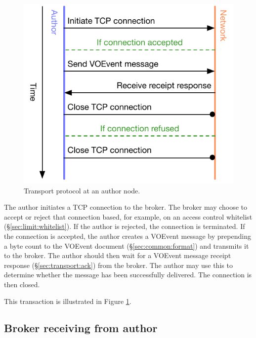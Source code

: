 \documentclass[a4paper,11pt]{ivoa}
\begin{document}
\begin{figure}
  \begin{center}
  \includegraphics{figures/authortobroker.pdf}
  \end{center}

  \caption{Transport protocol at an author node.}

  \label{fig:protocol:authortobroker}
\end{figure}

The author initiates a TCP connection to the broker. The broker may choose to
accept or reject that connection based, for example, on an access control
whitelist (\S\ref{sec:limit:whitelist}). If the author is rejected, the
connection is terminated. If the connection is accepted, the author creates a
VOEvent message by prepending a byte count to the VOEvent document
(\S\ref{sec:common:format}) and transmits it to the broker. The author should
then wait for a VOEvent message receipt response (\S\ref{sec:transport:ack})
from the broker. The author may use this to determine whether the message
has been successfully delivered. The connection is then closed.

This transaction is illustrated in Figure \ref{fig:protocol:authortobroker}.

\subsection{Broker receiving from author}
\label{sec:protocol:brokerfromauthor}
\end{document}
